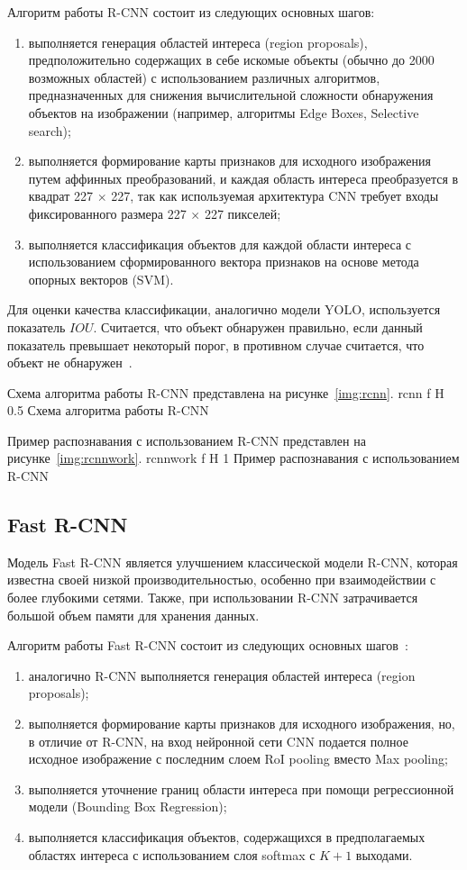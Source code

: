 Алгоритм работы R-CNN состоит из следующих основных шагов:
\begin{enumerate}
	\item выполняется генерация областей интереса (region proposals), предположительно содержащих в себе искомые объекты (обычно до 2000 возможных областей) с использованием различных алгоритмов, предназначенных для снижения вычислительной сложности обнаружения объектов на изображении (например, алгоритмы Edge Boxes, Selective search);
	\item выполняется формирование карты признаков для исходного изображения путем аффинных преобразований, и каждая область интереса преобразуется в квадрат 227 $\times$ 227,	так как используемая архитектура CNN требует входы фиксированного размера 227 $\times$ 227	пикселей;
	\item выполняется классификация объектов для каждой области интереса с использованием сформированного вектора признаков на основе метода опорных векторов (SVM).
\end{enumerate}
Для оценки качества классификации, аналогично модели YOLO, используется показатель $IOU$.
Считается, что объект обнаружен правильно, если данный показатель превышает некоторый порог, в противном случае считается, что объект не обнаружен~\cite{yolochina, rcnn}.

Схема алгоритма работы R-CNN представлена на рисунке~\ref{img:rcnn}.
	{rcnn}
	{f}
	{H}
	{0.5\textwidth}
	{Схема алгоритма работы R-CNN}

Пример распознавания с использованием R-CNN представлен на рисунке~\ref{img:rcnnwork}.
	{rcnnwork}
	{f}
	{H}
	{1\textwidth}
	{Пример распознавания с использованием R-CNN}

\subsection{Fast R-CNN}

Модель Fast R-CNN является улучшением классической модели R-CNN, которая известна своей низкой производительностью, особенно при взаимодействии с более глубокими сетями.
Также, при использовании R-CNN затрачивается большой объем памяти для хранения данных.

Алгоритм работы Fast R-CNN состоит из следующих основных шагов~\cite{yolochina, rcnn}:
\begin{enumerate}
	\item аналогично R-CNN выполняется генерация областей интереса (region proposals);
	\item выполняется формирование карты признаков для исходного изображения, но, в отличие от R-CNN, на вход нейронной сети CNN подается полное исходное изображение с последним слоем RoI pooling вместо Max pooling;
	\item выполняется уточнение границ области интереса при помощи регрессионной модели (Bounding Box Regression);
	\item выполняется классификация объектов, содержащихся в предполагаемых областях интереса с использованием слоя softmax с $K+1$ выходами.
\end{enumerate}

